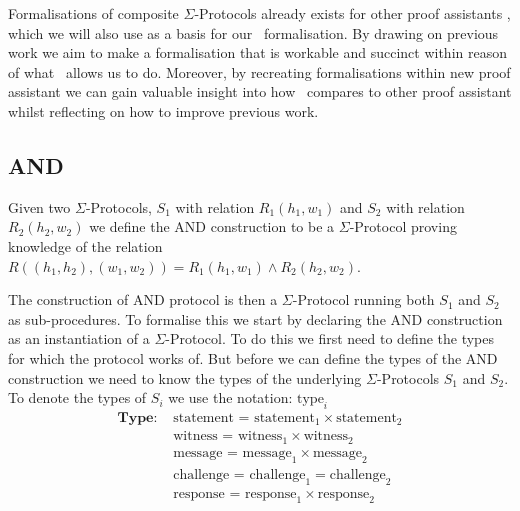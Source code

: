 Formalisations of composite $\Sigma$-Protocols already exists for other proof
assistants \cite{cryptoeprint:2019:1185,certicrypt_sigma}, which we will also
use as a basis for our \easycrypt\ formalisation. By drawing on previous work we
aim to make a formalisation that is workable and succinct within reason of what
\easycrypt\ allows us to do. Moreover, by recreating formalisations within new
proof assistant we can gain valuable insight into how \easycrypt\ compares to
other proof assistant whilst reflecting on how to improve previous work.

\subsection{AND}
\label{subsec:sigma_AND}
Given two $\Sigma$-Protocols, $S_{1}$ with relation $R_{1}(h_{1},w_{1})$ and
$S_{2}$ with relation $R_{2}(h_{2},w_{2})$ we define the AND construction to be a
$\Sigma$-Protocol proving knowledge of the relation
$R((h_{1}, h_{2}), (w_{1}, w_{2})) = R_{1}(h_{1}, w_{1}) \land R_{2}(h_{2}, w_{2})$.

The construction of AND protocol is then a $\Sigma$-Protocol running both
$S_{1}$ and $S_{2}$ as sub-procedures. To formalise this we start by declaring
the AND construction as an instantiation of a $\Sigma$-Protocol. To do this we
first need to define the types for which the protocol works of. But before we
can define the types of the AND construction we need to know the types of the
underlying $\Sigma$-Protocols $S_{1}$ and $S_{2}$. To denote the types of
$S_{i}$ we use the notation: $\text{type}_i$
\begin{align*}
  \textbf{Type: } &\text{statement = statement}_{1} \times \text{statement}_{2} \\
                  &\text{witness = witness}_{1} \times \text{witness}_{2} \\
                  &\text{message = message}_{1} \times \text{message}_{2} \\
                  &\text{challenge = challenge}_{1} = \text{challenge}_{2} \\
                  &\text{response = response}_{1} \times \text{response}_{2} \\
\end{align*}

